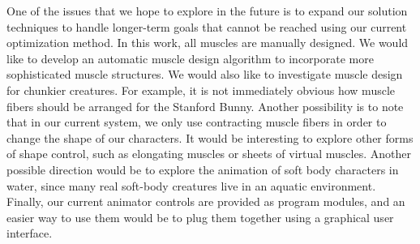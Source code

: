 One of the issues that we hope to explore in the future is to expand
our solution techniques to handle longer-term goals that cannot be
reached using our current optimization method. In this work, all muscles are manually designed.
We would like to develop an automatic muscle design algorithm to incorporate more sophisticated muscle structures.
We would also like to
investigate muscle design for chunkier creatures. For example, it is
not immediately obvious how muscle fibers should be arranged for the
Stanford Bunny. Another possibility is to note that in our current
system, we only use contracting muscle fibers in order to change the
shape of our characters.  It would be interesting to explore other
forms of shape control, such as elongating muscles or sheets of
virtual muscles.  Another possible direction would be to explore the
animation of soft body characters in water, since many real soft-body
creatures live in an aquatic environment.  Finally, our current
animator controls are provided as program modules, and an easier way
to use them would be to plug them together using a graphical user
interface.
